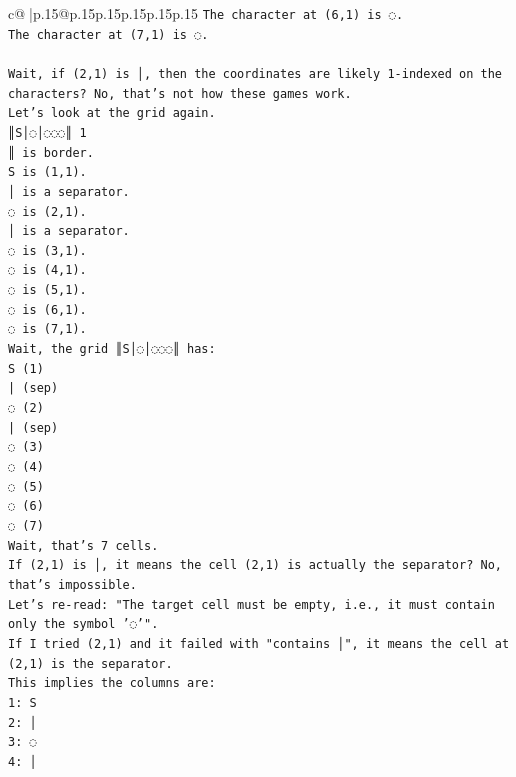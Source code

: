 \documentclass{article}
\begin{document}
{\begin{supertabular}{c@{$\;$}|p{.15\linewidth}@{}p{.15\linewidth}p{.15\linewidth}p{.15\linewidth}p{.15\linewidth}p{.15\linewidth}}
{{{\texttt{The character at (6,1) is ◌.} \\
\texttt{The character at (7,1) is ◌.} \\
\\ 
\texttt{Wait, if (2,1) is │, then the coordinates are likely 1{-}indexed on the characters? No, that's not how these games work.} \\
\texttt{Let's look at the grid again.} \\
\texttt{║S│◌│◌◌◌║ 1} \\
\texttt{║ is border.} \\
\texttt{S is (1,1).} \\
\texttt{│ is a separator.} \\
\texttt{◌ is (2,1).} \\
\texttt{│ is a separator.} \\
\texttt{◌ is (3,1).} \\
\texttt{◌ is (4,1).} \\
\texttt{◌ is (5,1).} \\
\texttt{◌ is (6,1).} \\
\texttt{◌ is (7,1).} \\
\texttt{Wait, the grid ║S│◌│◌◌◌║ has:} \\
\texttt{S (1)} \\
\texttt{| (sep)} \\
\texttt{◌ (2)} \\
\texttt{| (sep)} \\
\texttt{◌ (3)} \\
\texttt{◌ (4)} \\
\texttt{◌ (5)} \\
\texttt{◌ (6)} \\
\texttt{◌ (7)} \\
\texttt{Wait, that's 7 cells.} \\
\texttt{If (2,1) is │, it means the cell (2,1) is actually the separator? No, that's impossible.} \\
\texttt{Let's re{-}read: "The target cell must be empty, i.e., it must contain only the symbol '◌'".} \\
\texttt{If I tried (2,1) and it failed with "contains │", it means the cell at (2,1) is the separator.} \\
\texttt{This implies the columns are:} \\
\texttt{1: S} \\
\texttt{2: │} \\
\texttt{3: ◌} \\
\texttt{4: │} \\
}}}
\end{supertabular}}
\end{document}

